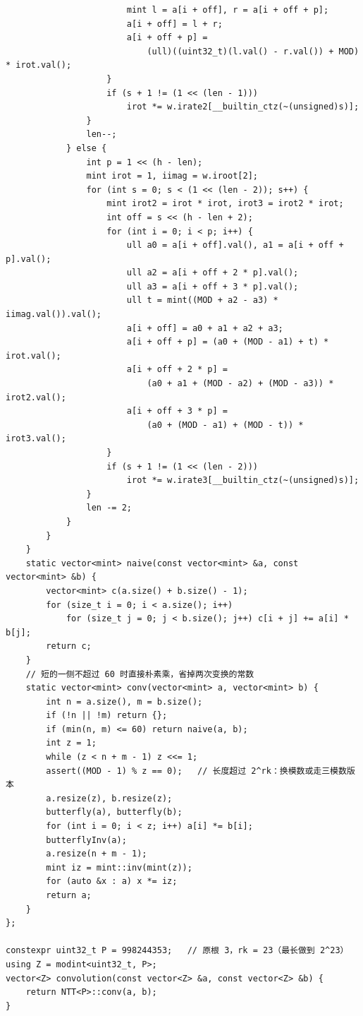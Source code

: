 \begin{verbatim}
                        mint l = a[i + off], r = a[i + off + p];
                        a[i + off] = l + r;
                        a[i + off + p] =
                            (ull)((uint32_t)(l.val() - r.val()) + MOD) * irot.val();
                    }
                    if (s + 1 != (1 << (len - 1)))
                        irot *= w.irate2[__builtin_ctz(~(unsigned)s)];
                }
                len--;
            } else {
                int p = 1 << (h - len);
                mint irot = 1, iimag = w.iroot[2];
                for (int s = 0; s < (1 << (len - 2)); s++) {
                    mint irot2 = irot * irot, irot3 = irot2 * irot;
                    int off = s << (h - len + 2);
                    for (int i = 0; i < p; i++) {
                        ull a0 = a[i + off].val(), a1 = a[i + off + p].val();
                        ull a2 = a[i + off + 2 * p].val();
                        ull a3 = a[i + off + 3 * p].val();
                        ull t = mint((MOD + a2 - a3) * iimag.val()).val();
                        a[i + off] = a0 + a1 + a2 + a3;
                        a[i + off + p] = (a0 + (MOD - a1) + t) * irot.val();
                        a[i + off + 2 * p] =
                            (a0 + a1 + (MOD - a2) + (MOD - a3)) * irot2.val();
                        a[i + off + 3 * p] =
                            (a0 + (MOD - a1) + (MOD - t)) * irot3.val();
                    }
                    if (s + 1 != (1 << (len - 2)))
                        irot *= w.irate3[__builtin_ctz(~(unsigned)s)];
                }
                len -= 2;
            }
        }
    }
    static vector<mint> naive(const vector<mint> &a, const vector<mint> &b) {
        vector<mint> c(a.size() + b.size() - 1);
        for (size_t i = 0; i < a.size(); i++)
            for (size_t j = 0; j < b.size(); j++) c[i + j] += a[i] * b[j];
        return c;
    }
    // 短的一侧不超过 60 时直接朴素乘，省掉两次变换的常数
    static vector<mint> conv(vector<mint> a, vector<mint> b) {
        int n = a.size(), m = b.size();
        if (!n || !m) return {};
        if (min(n, m) <= 60) return naive(a, b);
        int z = 1;
        while (z < n + m - 1) z <<= 1;
        assert((MOD - 1) % z == 0);   // 长度超过 2^rk：换模数或走三模数版本
        a.resize(z), b.resize(z);
        butterfly(a), butterfly(b);
        for (int i = 0; i < z; i++) a[i] *= b[i];
        butterflyInv(a);
        a.resize(n + m - 1);
        mint iz = mint::inv(mint(z));
        for (auto &x : a) x *= iz;
        return a;
    }
};

constexpr uint32_t P = 998244353;   // 原根 3，rk = 23（最长做到 2^23）
using Z = modint<uint32_t, P>;
vector<Z> convolution(const vector<Z> &a, const vector<Z> &b) {
    return NTT<P>::conv(a, b);
}
		\end{verbatim}

